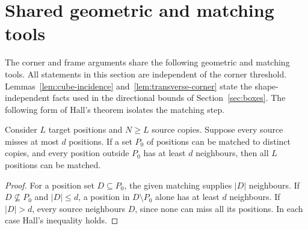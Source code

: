 \section{Shared geometric and matching tools}\label{sec:frames}
The corner and frame arguments share the following geometric and matching tools.
All statements in this section are independent of the corner threshold.
Lemmas~\ref{lem:cube-incidence} and~\ref{lem:transverse-corner} state the
shape-independent facts used in the directional bounds of
Section~\ref{sec:boxes}.
The following form of Hall's theorem isolates the matching step.

\begin{lemma}\label{lem:partial-matching}
Consider $L$ target positions and $N\ge L$ source copies. Suppose every
source misses at most $d$ positions. If a set $P_0$ of positions can be
matched to distinct copies, and every position outside $P_0$ has at least
$d$ neighbours, then all $L$ positions can be matched.
\end{lemma}
\begin{proof}
For a position set $D\subseteq P_0$, the given matching supplies $|D|$
neighbours. If $D\nsubseteq P_0$ and $|D|\le d$, a position in
$D\setminus P_0$ alone has at least $d$ neighbours. If $|D|>d$, every
source neighbours $D$, since none can miss all its positions. In each case
Hall's inequality holds.
\end{proof}


